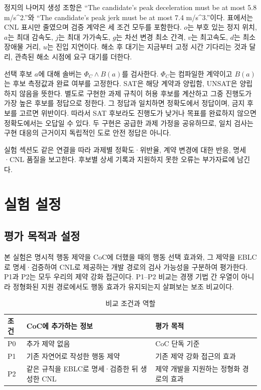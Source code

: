 \documentclass[10pt,a4paper,twocolumn]{article}\usepackage[margin=18mm]{geometry}\usepackage{fontspec,kotex}
\begin{document}
정지의 나머지 생성 조항은 “The candidate's peak deceleration must be at most 5.8 m/s\textasciicircum{}2.”와 “The candidate's peak jerk must be at most 7.4 m/s\textasciicircum{}3.”이다. 표에서는 CNL 표시만 줄였으며 검증 계약은 세 조건 모두를 포함한다. $o$는 부호 있는 정지 위치, $a$는 최대 감속도, $j$는 최대 가가속도, $g$는 차선 변경 최소 간격, $v$는 최고속도, $d$는 최소 장애물 거리, $u$는 진입 지연이다. 해소 후 대기는 지금부터 고정 시간 기다리는 것과 달리, 관측된 해소 시점에 요구 대기를 더한다.\par

선택 후보 $a$에 대해 솔버는 $\Phi_C\land B(a)$를 검사한다. $\Phi_C$는 컴파일한 계약이고 $B(a)$는 후보 측정값과 완료 여부를 고정한다. SAT은 해당 계약과 양립함, UNSAT은 양립하지 않음을 뜻한다. 별도로 구현한 과제 규칙이 허용 후보를 계산하고 그중 진행도가 가장 높은 후보를 정답으로 정한다. 그 정답과 일치하면 정확도에서 정답이며, 금지 후보를 고르면 위반이다. 따라서 SAT 후보라도 진행도가 낮거나 목표를 완료하지 않으면 정확도에서는 오답일 수 있다. 두 구현은 공급한 과제 가정을 공유하므로, 일치 검사는 구현 대응의 근거이지 독립적인 도로 안전 정답은 아니다.\par

실험 섹션도 같은 연결을 따라 과제별 정확도·위반율, 계약 변경에 대한 반응, 명세·CNL 품질을 보고한다. 후보별 상세 기록과 지원하지 못한 오류는 부가자료에 남긴다.\par
\section{실험 설정}

\subsection{평가 목적과 설정}

본 실험은 명시적 행동 제약을 CoC에 더했을 때의 행동 선택 효과와, 그 제약을 EBLC로 명세·검증하여 CNL로 제공하는 개발 경로의 검사 가능성을 구분하여 평가한다. P1과 P2는 모두 우리의 제약 강화 접근이다. P1--P2 비교는 경쟁 기법 간 우열이 아니라 정형화된 지원 경로에서도 행동 효과가 유지되는지 살펴보는 보조 비교이다.\par


\begin{table}[tp]\caption{비교 조건과 역할}
\centering\fontsize{8}{10}\selectfont\setlength{\tabcolsep}{3pt}
\begin{tabular}{@{}>{\raggedright\arraybackslash}p{}>{\raggedright\arraybackslash}p{}>{\raggedright\arraybackslash}p{}@{}}
\toprule
\textbf{조건} & \textbf{CoC에 추가하는 정보} & \textbf{평가 목적}\\
\midrule
P0 & 추가 제약 없음 & CoC 단독 기준\\[3pt]
P1 & 기존 자연어로 작성한 행동 제약 & 기존 제약 강화 접근의 효과\\[3pt]
P2 & 같은 규칙을 EBLC로 명세·검증한 뒤 생성한 CNL & 제약 개발을 지원하는 정형화 경로의 효과\\[3pt]
\bottomrule\end{tabular}
\end{table}
\end{document}
